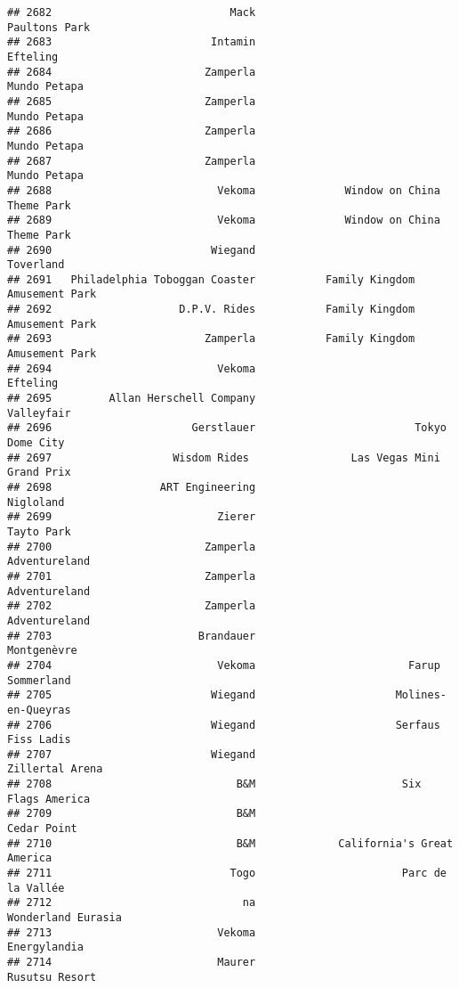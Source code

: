 \documentclass[
]{article}
\begin{document}
\begin{verbatim}
## 2682                            Mack                           Paultons Park
## 2683                         Intamin                                Efteling
## 2684                        Zamperla                            Mundo Petapa
## 2685                        Zamperla                            Mundo Petapa
## 2686                        Zamperla                            Mundo Petapa
## 2687                        Zamperla                            Mundo Petapa
## 2688                          Vekoma              Window on China Theme Park
## 2689                          Vekoma              Window on China Theme Park
## 2690                         Wiegand                               Toverland
## 2691   Philadelphia Toboggan Coaster           Family Kingdom Amusement Park
## 2692                    D.P.V. Rides           Family Kingdom Amusement Park
## 2693                        Zamperla           Family Kingdom Amusement Park
## 2694                          Vekoma                                Efteling
## 2695         Allan Herschell Company                              Valleyfair
## 2696                      Gerstlauer                         Tokyo Dome City
## 2697                   Wisdom Rides                Las Vegas Mini Grand Prix
## 2698                 ART Engineering                               Nigloland
## 2699                          Zierer                              Tayto Park
## 2700                        Zamperla                           Adventureland
## 2701                        Zamperla                           Adventureland
## 2702                        Zamperla                           Adventureland
## 2703                       Brandauer                             Montgenèvre
## 2704                          Vekoma                        Farup Sommerland
## 2705                         Wiegand                      Molines-en-Queyras
## 2706                         Wiegand                      Serfaus Fiss Ladis
## 2707                         Wiegand                         Zillertal Arena
## 2708                             B&M                       Six Flags America
## 2709                             B&M                             Cedar Point
## 2710                             B&M             California's Great America 
## 2711                            Togo                       Parc de la Vallée
## 2712                              na                      Wonderland Eurasia
## 2713                          Vekoma                            Energylandia
## 2714                          Maurer                          Rusutsu Resort

\end{verbatim}
\end{document}

